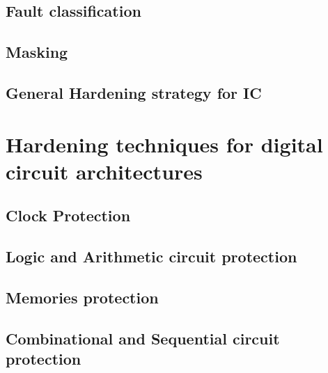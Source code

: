 {{{{			} 
			
		}%
		\subsection{Fault classification}{
		}%
		\subsection{Masking}{
			
			
		}%
		\subsection{General Hardening strategy for IC}{
		}%
		
	}
	\section{Hardening techniques for digital circuit architectures}{
		\subsection{Clock Protection}{
			
		}
		\subsection{Logic and Arithmetic circuit protection}{
			
		}
		\subsection{Memories protection}{
			
		}
		\subsection{Combinational and Sequential circuit protection}{
			
}}}
